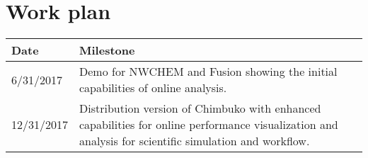 \section{Work plan}

\begin{tabular}{|p{0.7in}|p{5.5in}|}\hline
\textbf{Date}  & \textbf{Milestone} \\\hline
6/31/2017 &  Demo for NWCHEM and Fusion showing the initial capabilities of online analysis.\\\hline
12/31/2017 & Distribution version of Chimbuko with enhanced capabilities for online performance visualization and analysis for scientific simulation and workflow. \\\hline

\end{tabular}

